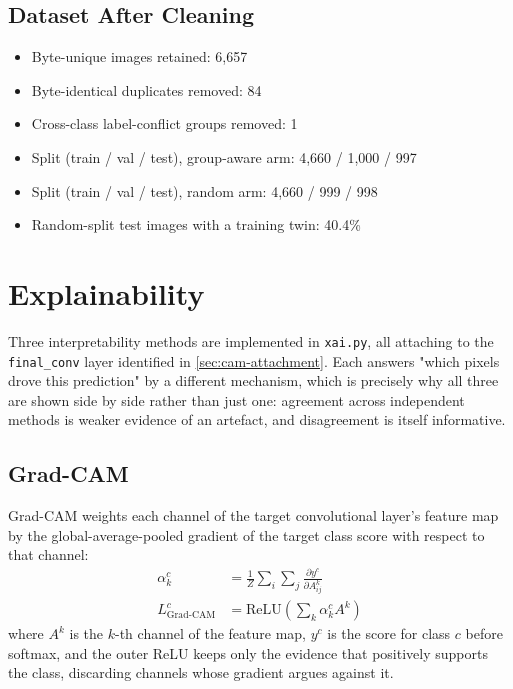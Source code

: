 \documentclass[11pt,a4paper,oneside]{report}
\newcommand{\code}[1]{\texttt{\small #1}}
\begin{document}
\section{Dataset After Cleaning}

\begin{itemize}
\item Byte-unique images retained: 6{,}657
\item Byte-identical duplicates removed: 84
\item Cross-class label-conflict groups removed: 1
\item Split (train / val / test), group-aware arm: 4{,}660 / 1{,}000 / 997
\item Split (train / val / test), random arm: 4{,}660 / 999 / 998
\item Random-split test images with a training twin: 40.4\%
\end{itemize}

\chapter{Explainability}
\label{ch:xai}

Three interpretability methods are implemented in \code{xai.py}, all
attaching to the \code{final\_conv} layer identified in
\cref{sec:cam-attachment}. Each answers "which pixels drove this prediction"
by a different mechanism, which is precisely why all three are shown
side by side rather than just one: agreement across independent methods is
weaker evidence of an artefact, and disagreement is itself informative.

\section{Grad-CAM}

Grad-CAM \cite{selvaraju2017} weights each channel of the target
convolutional layer's feature map by the global-average-pooled gradient of
the target class score with respect to that channel:
\begin{align}
\alpha_k^c &= \frac{1}{Z} \sum_i \sum_j \frac{\partial y^c}{\partial A^k_{ij}}
\label{eq:gradcam-alpha}\\
L^c_{\text{Grad-CAM}} &= \mathrm{ReLU}\!\left( \sum_k \alpha_k^c A^k \right)
\label{eq:gradcam-map}
\end{align}
where $A^k$ is the $k$-th channel of the feature map, $y^c$ is the score for
class $c$ before softmax, and the outer ReLU keeps only the evidence that
positively supports the class, discarding channels whose gradient argues
against it.
\end{document}
